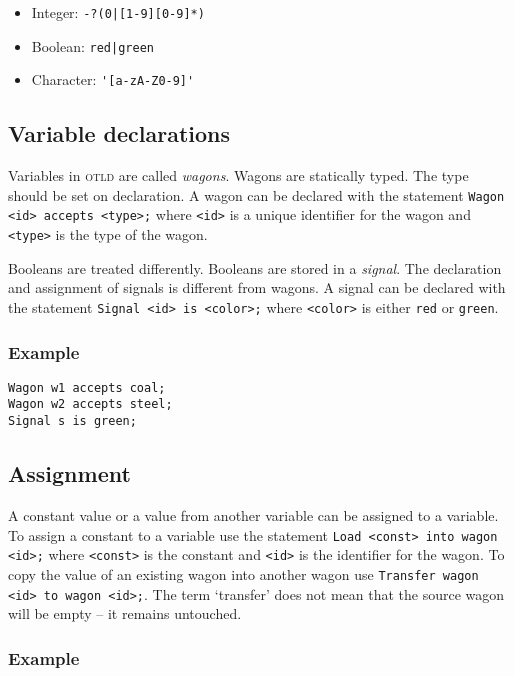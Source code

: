 \documentclass[10pt,a4paper,notitlepage]{article}
\newcommand{\shortname}{\textsc{otld} }
\begin{document}
\begin{itemize}
\item Integer: \verb=-?(0|[1-9][0-9]*)=
\item Boolean: \verb=red|green=
\item Character: \verb='[a-zA-Z0-9]'=
\end{itemize}

\subsection{Variable declarations}

Variables in \shortname are called \emph{wagons}. Wagons are statically typed. The type should be set on declaration.
A wagon can be declared with the statement \texttt{Wagon <id> accepts <type>;} where \texttt{<id>} is a unique identifier for the wagon and \texttt{<type>} is the type of the wagon.

Booleans are treated differently. Booleans are stored in a \emph{signal}. The declaration and assignment of signals is different from wagons. A signal can be declared with the statement \texttt{Signal <id> is <color>;} where \texttt{<color>} is either \texttt{red} or \texttt{green}.

\subsubsection*{Example}

\begin{lstlisting}
Wagon w1 accepts coal;
Wagon w2 accepts steel;
Signal s is green;
\end{lstlisting}

\subsection{Assignment}

A constant value or a value from another variable can be assigned to a variable. To assign a constant to a variable use the statement \texttt{Load <const> into wagon <id>;} where \texttt{<const>} is the constant and \texttt{<id>} is the identifier for the wagon. To copy the value of an existing wagon into another wagon use \texttt{Transfer wagon <id> to wagon <id>;}. The term `transfer' does not mean that the source wagon will be empty -- it remains untouched.

\subsubsection*{Example}
\end{document}
